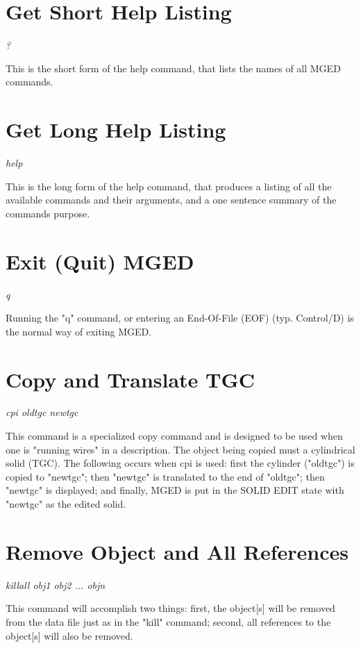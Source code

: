 \section{Get Short Help Listing}

{\em\center
?
}

This is the short form of the help command,
that lists the names of all MGED commands.

\section{Get Long Help Listing}

{\em\center
help
}

This is the long form of the help command,
that produces a listing of all the available commands and their
arguments, and a one sentence summary of the commands purpose.

\section{Exit (Quit) MGED}

{\em\center
q
}

Running the "q" command, or entering an End-Of-File (EOF) (typ. Control/D)
is the normal way of exiting MGED.

\section{Copy and Translate TGC}

{\em \center
cpi oldtgc newtgc
}

This command is a specialized copy command and is designed to be used when one
is "running wires" in a description.
The object being copied must a cylindrical solid (TGC).
The following occurs when cpi is used:  first the cylinder ("oldtgc") is
copied to "newtgc"; then "newtgc" is translated to the end of "oldtgc";
then "newtgc" is displayed; and finally, MGED is put in the SOLID EDIT state
with "newtgc" as the edited solid.

\section{Remove Object and All References}

{\em \center
killall obj1 obj2 ... objn
}

This command will accomplish two things:  first, the object[s] will be
removed from the data file just as in the "kill" command;  second, all
references to the object[s] will also be removed.

